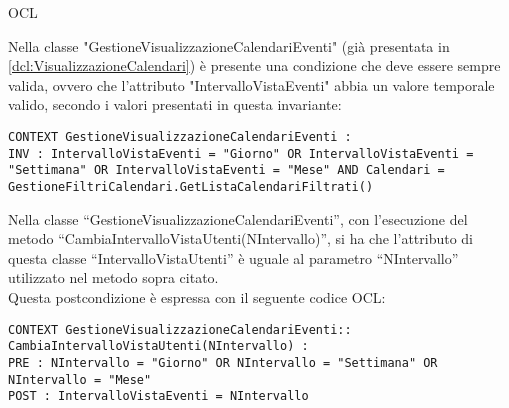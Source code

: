 \begin{listaPersonale}{OCL}
    \begin{center}
        
    \end{center}
    Nella classe "GestioneVisualizzazioneCalendariEventi" (già presentata in \ref{dcl:VisualizzazioneCalendari}) è presente una condizione che deve essere sempre valida, ovvero che l'attributo "IntervalloVistaEventi" abbia un valore temporale valido, secondo i valori presentati in questa invariante:
    \begin{lstlisting}
CONTEXT GestioneVisualizzazioneCalendariEventi :
INV : IntervalloVistaEventi = "Giorno" OR IntervalloVistaEventi = "Settimana" OR IntervalloVistaEventi = "Mese" AND Calendari = GestioneFiltriCalendari.GetListaCalendariFiltrati()
    \end{lstlisting}
    Nella classe “GestioneVisualizzazioneCalendariEventi”, con l'esecuzione del metodo “CambiaIntervalloVistaUtenti(NIntervallo)”, si ha che l'attributo di questa classe “IntervalloVistaUtenti” è uguale al parametro “NIntervallo” utilizzato nel metodo sopra citato. \\
    Questa postcondizione è espressa con il seguente codice OCL:
    \begin{lstlisting}
CONTEXT GestioneVisualizzazioneCalendariEventi:: CambiaIntervalloVistaUtenti(NIntervallo) :
PRE : NIntervallo = "Giorno" OR NIntervallo = "Settimana" OR NIntervallo = "Mese"
POST : IntervalloVistaEventi = NIntervallo
    \end{lstlisting}
    \newpage




\end{listaPersonale}
